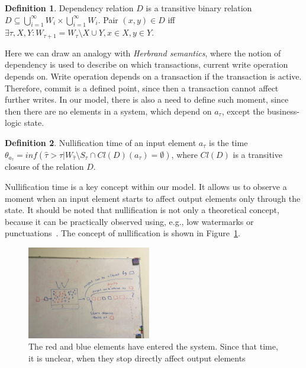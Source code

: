 \documentclass[sigconf]{acmart}
\theoremstyle{definition}
\newtheorem{definition}{Definition}
\begin{document}
\begin{definition}{Dependency relation}
$D$ is a transitive binary relation $D\subseteq{{\bigcup^{\infty}_{i=1}{W_i}}\times{{\bigcup^{\infty}_{i=1}{W_i}}}}$. Pair $(x,y)\in{D}$ iff $\exists{\tau,X,Y}:W_{\tau+1}=W_\tau\setminus{X}\cup{Y}, x\in{X}, y\in{Y}$.
\end{definition}

Here we can draw an analogy with {\em Herbrand semantics}, where the notion of dependency is used to describe on which transactions, current write operation depends on. Write operation depends on a transaction if the transaction is active. Therefore, commit is a defined point, since then a transaction cannot affect further writes. In our model, there is also a need to define such moment, since then there are no elements in a system, which depend on $a_\tau$, except the business-logic state.

\begin{definition}{Nullification time}
of an input element $a_\tau$ is the time $\theta_{a_\tau}=inf(\hat{\tau}>\tau|W_{\hat{\tau}}\setminus{S_{\hat{\tau}}}\cap{Cl(D)(a_\tau)=\emptyset})$, where $Cl(D)$ is a transitive closure of the relation $D$.
\end{definition}

Nullification time is a key concept within our model. It allows us to observe a moment when an input element starts to affect output elements only through the state. It should be noted that nullification is not only a theoretical concept, because it can be practically observed using, e.g., low watermarks or punctuations~\cite{Tucker:2003:EPS:776752.776780}. The concept of nullification is shown in Figure~\ref{nullification}.

\begin{figure}[htbp]
  \centering
  \includegraphics[width=0.48\textwidth]{pics/nullification}
  \caption{The red and blue elements have entered the system. Since that time, it is unclear, when they stop directly affect output elements}
  \label {nullification}
\end{figure}
\end{document}
